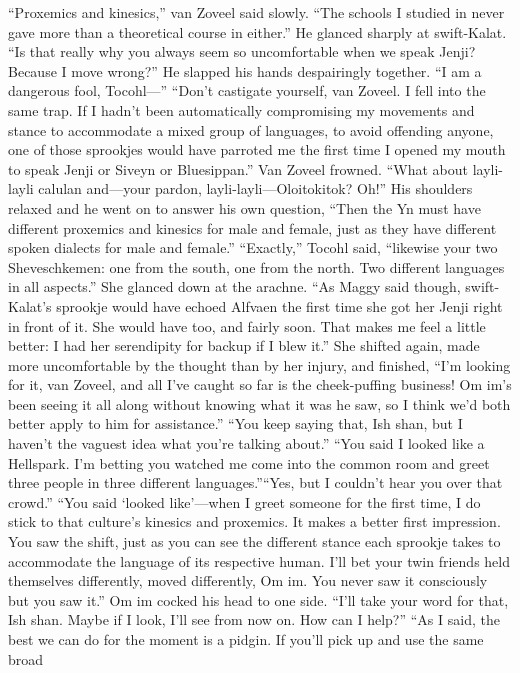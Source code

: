 \documentclass[9pt]{article}
\begin{document}
“Proxemics and kinesics,” van Zoveel said slowly. “The schools I studied in never gave more than a
theoretical course in either.” He glanced sharply at swift-Kalat. “Is that really why you always seem so
uncomfortable when we speak Jenji? Because I move wrong?” He slapped his hands despairingly
together. “I am a dangerous fool, Tocohl—”
“Don’t castigate yourself, van Zoveel. I fell into the same trap. If I hadn’t been automatically
compromising my movements and stance to accommodate a mixed group of languages, to avoid
offending anyone, one of those sprookjes would have parroted me the first time I opened my mouth to
speak Jenji or Siveyn or Bluesippan.”
Van Zoveel frowned. “What about layli-layli calulan and—your pardon, layli-layli—Oloitokitok?
Oh!” His shoulders relaxed and he went on to answer his own question, “Then the Yn must have different
proxemics and kinesics for male and female, just as they have different spoken dialects for male and
female.”
“Exactly,” Tocohl said, “likewise your two Sheveschkemen: one from the south, one from the north.
Two different languages in all aspects.” She glanced down at the arachne. “As Maggy said though,
swift-Kalat’s sprookje would have echoed Alfvaen the first time she got her Jenji right in front of it. She
would have too, and fairly soon. That makes me feel a little better: I had her serendipity for backup if I
blew it.”
She shifted again, made more uncomfortable by the thought than by her injury, and finished, “I’m
looking for it, van Zoveel, and all I’ve caught so far is the cheek-puffing business! Om im’s been seeing it
all along without knowing what it was he saw, so I think we’d both better apply to him for assistance.”
“You keep saying that, Ish shan, but I haven’t the vaguest idea what you’re talking about.”
“You said I looked like a Hellspark. I’m betting you watched me come into the common room and
greet three people in three different languages.”“Yes, but I couldn’t hear you over that crowd.”
“You said ‘looked like’—when I greet someone for the first time, I do stick to that culture’s kinesics
and proxemics. It makes a better first impression. You saw the shift, just as you can see the different
stance each sprookje takes to accommodate the language of its respective human. I’ll bet your twin
friends held themselves differently, moved differently, Om im. You never saw it consciously but you saw
it.”
Om im cocked his head to one side. “I’ll take your word for that, Ish shan. Maybe if I look, I’ll see
from now on. How can I help?”
“As I said, the best we can do for the moment is a pidgin. If you’ll pick up and use the same broad
\end{document}
